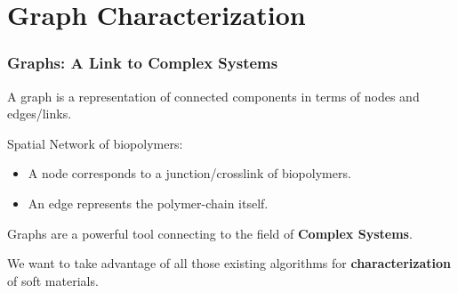 \documentclass[9pt]{beamer}
\begin{document}
\section{Graph Characterization}
\begin{frame}
  \frametitle{Graphs: A Link to Complex Systems}
  A graph is a representation of connected components in terms of nodes and edges/links.

  \begin{exampleblock}{Spatial Network of biopolymers:}
    \begin{itemize}
      \item A node corresponds to a junction/crosslink of biopolymers.
      \item An edge represents the polymer-chain itself.
    \end{itemize}
  \end{exampleblock}

  Graphs are a powerful tool connecting to the field of \textbf{Complex Systems}.

  We want to take advantage of all those existing algorithms for \textbf{characterization} of soft materials.

\end{frame}
\end{document}
